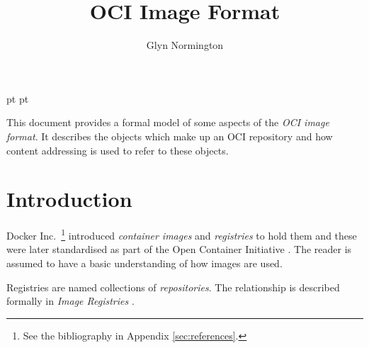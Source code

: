 \documentclass[a4paper,twoside,12pt]{article}
\begin{document}
 pt
 pt

\def\Slash{\slash\hspace{0pt}}

\title{OCI Image Format}

\author{Glyn Normington}

\maketitle
\thispagestyle{empty}
\setcounter{page}{1}


This document provides a formal model of some aspects of the \textit{OCI image format}. It describes the objects which make
up an OCI repository and how content addressing is used to refer to these objects.



\newcommand{\true}{true}
\newcommand{\false}{false}
\renewcommand{\emptyset}{\varnothing}

\clearpage
\tableofcontents

\cleardoublepage
{}
\setcounter{page}{1}

\section{Introduction}

Docker Inc.\ \cite{docker}\footnote{See the bibliography in Appendix \ref{sec:references}.} introduced \textit{container images} and \textit{registries} to hold them and these were later standardised as part of the Open Container Initiative \cite{oci}. The reader is assumed to have a basic understanding of how images are used.

Registries are named collections of \textit{repositories}. The relationship is described formally in \textit{Image Registries} \cite{registries}.
\end{document}
